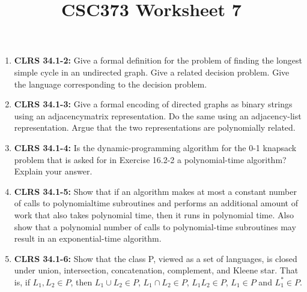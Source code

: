 \documentclass[12pt]{article}
\begin{document}
\title{CSC373 Worksheet 7}
\maketitle

\begin{enumerate}[1.]
    \item \textbf{CLRS 34.1-2:} Give a formal definition for the problem of finding the longest simple cycle in an
    undirected graph. Give a related decision problem. Give the language corresponding
    to the decision problem.

    \item \textbf{CLRS 34.1-3:} Give a formal encoding of directed graphs as binary strings using an adjacencymatrix
    representation. Do the same using an adjacency-list representation. Argue
    that the two representations are polynomially related.

    \item \textbf{CLRS 34.1-4:} Is the dynamic-programming algorithm for the 0-1 knapsack problem that is asked
    for in Exercise 16.2-2 a polynomial-time algorithm? Explain your answer.

    \item \textbf{CLRS 34.1-5:} Show that if an algorithm makes at most a constant number of calls to polynomialtime
    subroutines and performs an additional amount of work that also takes polynomial
    time, then it runs in polynomial time. Also show that a polynomial number of
    calls to polynomial-time subroutines may result in an exponential-time algorithm.

    \item \textbf{CLRS 34.1-6:} Show that the class P, viewed as a set of languages, is closed under union, intersection,
    concatenation, complement, and Kleene star. That is, if $L_1, L_2 \in P$, then
    $L_1 \cup L_2 \in P$, $L_1 \cap L_2 \in P$, $L_1L_2 \in P$, $L_1 \in P$ and $L_1^* \in P$.
\end{enumerate}
\end{document}
